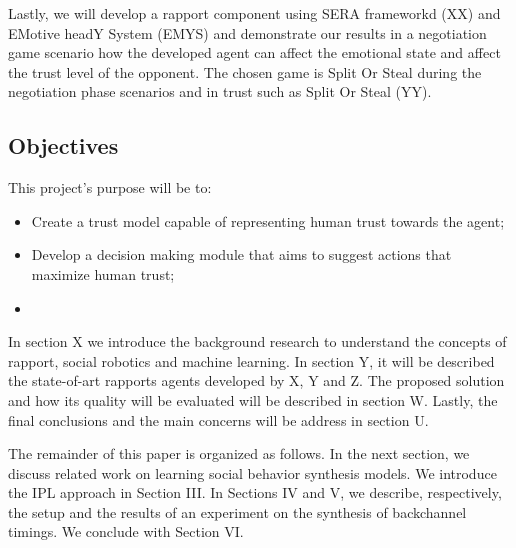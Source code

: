 Lastly, we will  develop a rapport component using SERA frameworkd (XX) and EMotive headY System (EMYS) and demonstrate our results in a negotiation game scenario how the developed agent can affect the emotional state and affect the trust level of the opponent. The chosen game is Split Or Steal during the negotiation phase scenarios and in trust such as Split Or Steal (YY).


%
%



\subsection{Objectives}
\label{subsec:Objectives}
This project's purpose will be to:
\begin{itemize}
	\item Create a trust model capable of representing human trust towards the agent;
	\item Develop a decision making module that aims to suggest actions that maximize human trust;
	\item 
\end{itemize}





In section X we introduce the background research to understand the concepts of rapport, social robotics and machine learning. In section Y, it will be described the state-of-art rapports agents developed by X, Y and Z. The proposed solution and how its quality will be evaluated will be described in section W. Lastly, the final conclusions and the main concerns will be address in section U.

The remainder of this paper is organized as follows. In
the next section, we discuss related work on learning social behavior synthesis models. We introduce the IPL approach in Section III. In Sections IV and V, we describe, respectively, the setup and the results of an experiment on the synthesis of backchannel timings. We conclude with Section VI.
